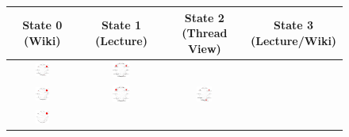 \begin{figure}
  \centering
  \begin{tabular}{cccc}
    \textbf{State 0 (Wiki)} & \textbf{State 1 (Lecture)}
    & \textbf{State 2 (Thread View)} & \textbf{State 3 (Lecture/Wiki)}\\\hline
    \includegraphics[width=0.22\textwidth]{figures/text-2state/state0.png}
    &
    \includegraphics[width=0.22\textwidth]{figures/text-2state/state1.png}\\
    \includegraphics[width=0.22\textwidth]{figures/text-3state/state0.png}
    &
    \includegraphics[width=0.22\textwidth]{figures/text-3state/state1.png}
    &
    \includegraphics[width=0.22\textwidth]{figures/text-3state/state2.png}\\
    \includegraphics[width=0.22\textwidth]{figures/text-4state/state0.png}

\end{tabular}
\end{figure}
